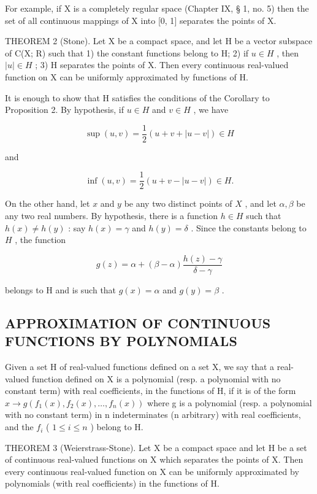 For example, if X is a completely regular space (Chapter IX, § 1, no. 5) then the set of all continuous mappings of X into {[}0, 1{]} separates the points of X.

THEOREM 2 (Stone). Let X be a compact space, and let H be a vector subspace of C(X; R) such that 1) the constant functions belong to H; 2) if \(u \in H\) , then \(|u| \in H\) ; 3) H separates the points of X. Then every continuous real-valued function on X can be uniformly approximated by functions of H.

It is enough to show that H satisfies the conditions of the Corollary to Proposition 2. By hypothesis, if \(u \in H\) and \(v \in H\) , we have

\[
\sup (u, v) = \frac {1}{2} (u + v + | u - v |) \in H
\]

and

\[
\inf (u, v) = \frac {1}{2} (u + v - | u - v |) \in H.
\]

On the other hand, let \(x\) and \(y\) be any two distinct points of \(X\) , and let \(\alpha, \beta\) be any two real numbers. By hypothesis, there is a function \(h \in H\) such that \(h(x) \neq h(y)\) : say \(h(x) = \gamma\) and \(h(y) = \delta\) . Since the constants belong to \(H\) , the function

\[
g (z) = \alpha + (\beta - \alpha) \frac {h (z) - \gamma}{\delta - \gamma}
\]

belongs to H and is such that \(g(x) = \alpha\) and \(g(y) = \beta\) .

\subsection{APPROXIMATION OF CONTINUOUS FUNCTIONS BY POLYNOMIALS}

Given a set H of real-valued functions defined on a set X, we say that a real-valued function defined on X is a polynomial (resp. a polynomial with no constant term) with real coefficients, in the functions of H, if it is of the form \(x \to g(f_{1}(x), f_{2}(x), \ldots, f_{n}(x))\) where g is a polynomial (resp. a polynomial with no constant term) in n indeterminates (n arbitrary) with real coefficients, and the \(f_{i}\) ( \(1 \leqslant i \leqslant n\) ) belong to H.

THEOREM 3 (Weierstrass-Stone). Let X be a compact space and let H be a set of continuous real-valued functions on X which separates the points of X. Then every continuous real-valued function on X can be uniformly approximated by polynomials (with real coefficients) in the functions of H.

